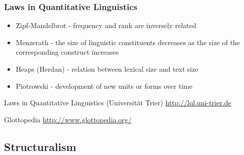 \documentclass[notes]{beamer}
\begin{document}
\frame
{
  \frametitle{Laws in Quantitative Linguistics}
  \begin{itemize}
  \item Zipf-Mandelbrot - frequency and rank are inversely related
  \item Menzerath - the size of linguistic constituents decreases as the size of the corresponding construct increases
  \item Heaps (Herdan) - relation between lexical size and text size
  \item Piotrowski - development of new units or forms over time
  \end{itemize}
  
  \begin{small}
  Laws in Quantitative Linguistics (Universit\"{a}t Trier)
  \href{http://lql.uni-trier.de}{http://lql.uni-trier.de}

  Glottopedia
  \href{http://www.glottopedia.org/}{http://www.glottopedia.org/}
  \end{small}
}


\subsection{Structuralism}
\end{document}
